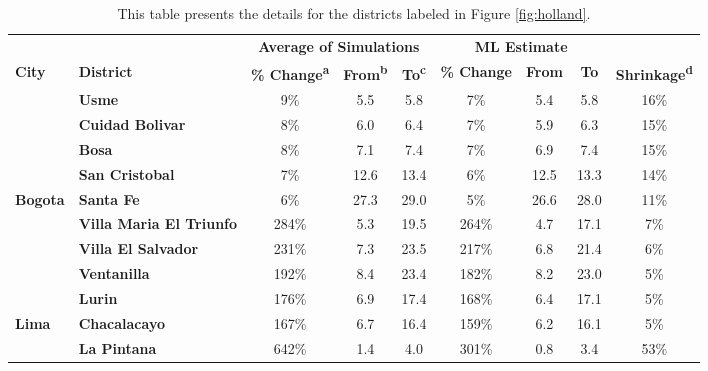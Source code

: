 \begin{table}[!h]

\caption{\label{tab:top-5}This table presents the details for the districts labeled in Figure \ref{fig:holland}.}
\centering
\fontsize{8}{10}\selectfont
\begin{tabular}[t]{>{}l>{}lccccccc}
\toprule
\multicolumn{2}{c}{\textbf{ }} & \multicolumn{3}{c}{\textbf{Average of Simulations}} & \multicolumn{3}{c}{\textbf{ML Estimate}} & \multicolumn{1}{c}{\textbf{ }} \\
\cmidrule(l{3pt}r{3pt}){3-5} \cmidrule(l{3pt}r{3pt}){6-8}
\textbf{City} & \textbf{District} & \textbf{\% Change\textsuperscript{a}} & \textbf{From\textsuperscript{b}} & \textbf{To\textsuperscript{c}} & \textbf{\% Change} & \textbf{From} & \textbf{To} & \textbf{Shrinkage\textsuperscript{d}}\\
\midrule
 & \textbf{Usme} & 9\% & 5.5 & 5.8 & 7\% & 5.4 & 5.8 & 16\%\\

 & \textbf{Cuidad Bolivar} & 8\% & 6.0 & 6.4 & 7\% & 5.9 & 6.3 & 15\%\\

 & \textbf{Bosa} & 8\% & 7.1 & 7.4 & 7\% & 6.9 & 7.4 & 15\%\\

 & \textbf{San Cristobal} & 7\% & 12.6 & 13.4 & 6\% & 12.5 & 13.3 & 14\%\\

\multirow{-5}{*}{\raggedright\arraybackslash \textbf{Bogota}} & \textbf{Santa Fe} & 6\% & 27.3 & 29.0 & 5\% & 26.6 & 28.0 & 11\%\\
\cmidrule{1-9}
 & \textbf{Villa Maria El Triunfo} & 284\% & 5.3 & 19.5 & 264\% & 4.7 & 17.1 & 7\%\\

 & \textbf{Villa El Salvador} & 231\% & 7.3 & 23.5 & 217\% & 6.8 & 21.4 & 6\%\\

 & \textbf{Ventanilla} & 192\% & 8.4 & 23.4 & 182\% & 8.2 & 23.0 & 5\%\\

 & \textbf{Lurin} & 176\% & 6.9 & 17.4 & 168\% & 6.4 & 17.1 & 5\%\\

\multirow{-5}{*}{\raggedright\arraybackslash \textbf{Lima}} & \textbf{Chacalacayo} & 167\% & 6.7 & 16.4 & 159\% & 6.2 & 16.1 & 5\%\\
\cmidrule{1-9}
 & \textbf{La Pintana} & 642\% & 1.4 & 4.0 & 301\% & 0.8 & 3.4 & 53\%\\


\end{tabular}
\end{table}
